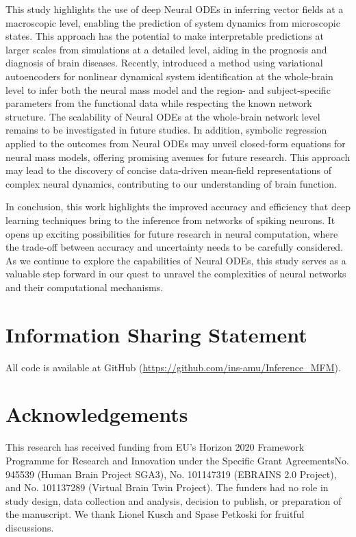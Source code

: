 \documentclass[preprint,11pt,authoryear]{elsarticle}
\begin{document}
This study highlights the use of deep Neural ODEs in inferring vector fields at a macroscopic level, enabling the prediction of system dynamics from microscopic states. This approach has the potential to make interpretable predictions at larger scales from simulations at a detailed level, aiding in the prognosis and diagnosis of brain diseases. Recently, \cite{Sip2023} introduced a method using variational autoencoders for nonlinear dynamical system identification at the whole-brain level to infer both the neural mass model and the region- and subject-specific parameters from the functional data while respecting the known network structure. The scalability of Neural ODEs at the whole-brain network level remains to be investigated in future studies. In addition, symbolic regression applied to the outcomes from Neural ODEs may unveil closed-form equations for neural mass models, offering promising avenues for future research. This approach may lead to the discovery of concise data-driven mean-field representations of complex neural dynamics, contributing to our understanding of brain function.



In conclusion, this work highlights the improved accuracy and efficiency that deep learning techniques bring to the inference from networks of spiking neurons. It opens up exciting possibilities for future research in neural computation, where the trade-off between accuracy and uncertainty needs to be carefully considered. As we continue to explore the capabilities of Neural ODEs, this study serves as a valuable step forward in our quest to unravel the complexities of neural networks and their computational mechanisms.




\section*{Information Sharing Statement}

All code is available at GitHub (\url{https://github.com/ins-amu/Inference_MFM}).


\section*{Acknowledgements}

This research has received funding from EU's Horizon 2020 Framework Programme for Research and Innovation under the Specific Grant AgreementsNo. 945539 (Human Brain Project SGA3), No. 101147319 (EBRAINS 2.0 Project), and No. 101137289 (Virtual Brain Twin Project). The funders had no role in study design, data collection and analysis, decision to publish, or preparation of the manuscript. We thank Lionel Kusch and Spase Petkoski for fruitful discussions.
\end{document}
